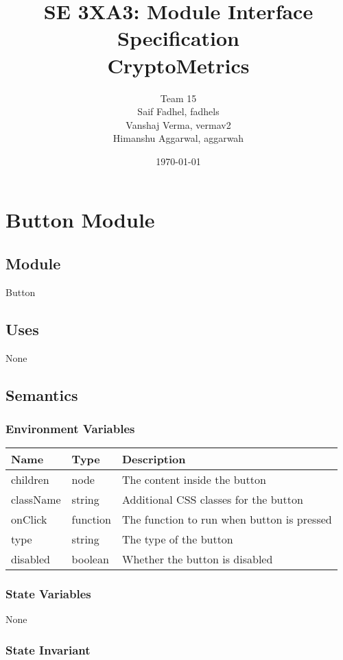 \documentclass[12pt]{article}
\title{SE 3XA3: Module Interface Specification\\CryptoMetrics}
\author{Team 15
		\\ Saif Fadhel, fadhels
		\\ Vanshaj Verma, vermav2
		\\ Himanshu Aggarwal, aggarwah
}
\date{\today}
\begin{document}
\maketitle


\newpage
\tableofcontents

\newpage 
\section{Button Module}

\subsection{Module}
Button

\subsection{Uses}
None

\subsection{Semantics}

\subsubsection{Environment Variables}
\begin{tabular}{| l | l | p{8cm} |}
    \hline
    \textbf{Name} & \textbf{Type} & \textbf{Description}\\ \hline
    children & node & The content inside the button\\ \hline
    className & string & Additional CSS classes for the button\\ \hline
    onClick & function & The function to run when button is pressed\\ \hline
    type & string & The type of the button\\ \hline
    disabled & boolean & Whether the button is disabled\\ \hline
\end{tabular}

\subsubsection{State Variables}
None

\subsubsection{State Invariant}
\end{document}
